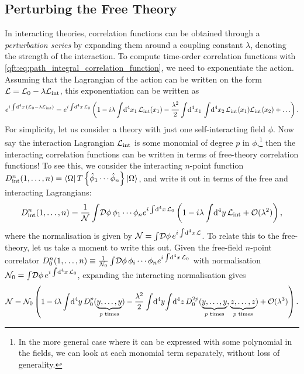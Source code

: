 \documentclass[../main.tex]{subfiles}
\begin{document}
\subsection{Perturbing the Free Theory}
In interacting theories, correlation functions can be obtained through a \emph{perturbation series} by expanding them around a coupling constant \(\lambda\), denoting the strength of the interaction.
To compute time-order correlation functions with \cref{qft:eq:path_integral_correlation_function}, we need to exponentiate the action.
Assuming that the Lagrangian of the action can be written on the form \(\mathcal{L} = \mathcal{L}_0 - \lambda\mathcal{L}_\text{int}\), this exponentiation can be written as
\begin{align}
  e^{i \int \!\mathrm{d}^4x\, \left(\mathcal{L}_0 - \lambda\mathcal{L}_\text{int}\right)} = e^{i \int \!\mathrm{d}^4x\, \mathcal{L}_0} \left(1 - i\lambda\int \!\mathrm{d}^4x_1\, \mathcal{L}_\text{int}(x_1) - \frac{\lambda^2}{2} \int \!\mathrm{d}^4x_1\,\int \!\mathrm{d}^4x_2\, \mathcal{L}_\text{int}(x_1) \mathcal{L}_\text{int}(x_2) + \ldots\right).
\end{align}
For simplicity, let us consider a theory with just one self-interacting field \(\phi\).
Now say the interaction Lagrangian \(\mathcal{L}_\text{int}\) is some monomial of degree \(p\) in \(\phi\),\footnote{In the more general case where it can be expressed with some polynomial in the fields, we can look at each monomial term separately, without loss of generality.} then the interacting correlation functions can be written in terms of free-theory correlation functions!
To see this, we consider the interacting \(n\)-point function \(D^n_\text{int}(1,\ldots, n) = \left\langle \Omega \right| T\left\{\hat\phi_1 \cdots \hat\phi_n\right\} \left| \Omega \right\rangle\), and write it out in terms of the free and interacting Lagrangians:
\begin{align}
  \label{qft:eq:n-point_interactive_correlator}
  D^n_\text{int}(1,\ldots, n) = \frac{1}{\mathcal{N}} \int\!\mathcal{D}\phi\, \phi_1\cdots \phi_n e^{i\int \!\mathrm{d}^4x\,\mathcal{L}_0}\left(1 - i\lambda \int \!\mathrm{d}^4y\,\mathcal{L}_\text{int} + \mathcal{O}(\lambda^2)\right),
\end{align}
where the normalisation is given by \(\mathcal{N} = \int\!\mathcal{D}\phi\, e^{i\int \!\mathrm{d}^4x\,\mathcal{L}}\).
To relate this to the free-theory, let us take a moment to write this out.
Given the free-field \(n\)-point correlator \(D^n_0(1,\ldots,n) \equiv \frac{1}{\mathcal{N}_0} \int\!\mathcal{D}\phi\, \phi_i \cdots \phi_n e^{i\int \!\mathrm{d}^4x\,\mathcal{L}_0}\) with normalisation \(\mathcal{N}_0 = \int\!\mathcal{D}\phi\, e^{i\int \!\mathrm{d}^4x\,\mathcal{L}_0}\), expanding the interacting normalisation gives
\begin{equation}
  \mathcal{N} = \mathcal{N}_0 \left(1 - i\lambda \int \!\mathrm{d}^4y\, D_0^p(\underbrace{y, \ldots, y}_{p\text{ times}}) - \frac{\lambda^2}{2} \int \!\mathrm{d}^4y\,\!\! \int \!\mathrm{d}^4z\, D_0^{2p}(\underbrace{y,\ldots,y}_{p\text{ times}}, \underbrace{z,\ldots,z}_{p\text{ times}}) + \mathcal{O}(\lambda^3)\right).
\end{equation}
\end{document}
